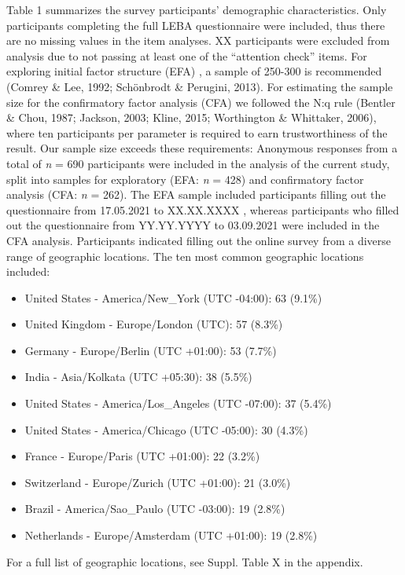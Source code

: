 \documentclass[
  english,
  man]{apa6}
\providecommand{\tightlist}{%
  \setlength{\itemsep}{0pt}\setlength{\parskip}{0pt}}
\begin{document}
Table 1 summarizes the survey participants' demographic characteristics. Only participants completing the full LEBA questionnaire were included, thus there are no missing values in the item analyses. XX participants were excluded from analysis due to not passing at least one of the ``attention check'' items. For exploring initial factor structure (EFA) , a sample of 250-300 is recommended (Comrey \& Lee, 1992; Schönbrodt \& Perugini, 2013). For estimating the sample size for the confirmatory factor analysis (CFA) we followed the N:q rule (Bentler \& Chou, 1987; Jackson, 2003; Kline, 2015; Worthington \& Whittaker, 2006), where ten participants per parameter is required to earn trustworthiness of the result. Our sample size exceeds these requirements: Anonymous responses from a total of \emph{n} = 690 participants were included in the analysis of the current study, split into samples for exploratory (EFA: \emph{n} = 428) and confirmatory factor analysis (CFA: \emph{n} = 262). The EFA sample included participants filling out the questionnaire from 17.05.2021 to XX.XX.XXXX , whereas participants who filled out the questionnaire from YY.YY.YYYY to 03.09.2021 were included in the CFA analysis. Participants indicated filling out the online survey from a diverse range of geographic locations. The ten most common geographic locations included:

\begin{itemize}
\tightlist
\item
  United States - America/New\_York (UTC -04:00): 63 (9.1\%)
\item
  United Kingdom - Europe/London (UTC): 57 (8.3\%)
\item
  Germany - Europe/Berlin (UTC +01:00): 53 (7.7\%)
\item
  India - Asia/Kolkata (UTC +05:30): 38 (5.5\%)
\item
  United States - America/Los\_Angeles (UTC -07:00): 37 (5.4\%)
\item
  United States - America/Chicago (UTC -05:00): 30 (4.3\%)
\item
  France - Europe/Paris (UTC +01:00): 22 (3.2\%)
\item
  Switzerland - Europe/Zurich (UTC +01:00): 21 (3.0\%)
\item
  Brazil - America/Sao\_Paulo (UTC -03:00): 19 (2.8\%)
\item
  Netherlands - Europe/Amsterdam (UTC +01:00): 19 (2.8\%)
\end{itemize}

For a full list of geographic locations, see Suppl. Table X in the appendix.
\end{document}
